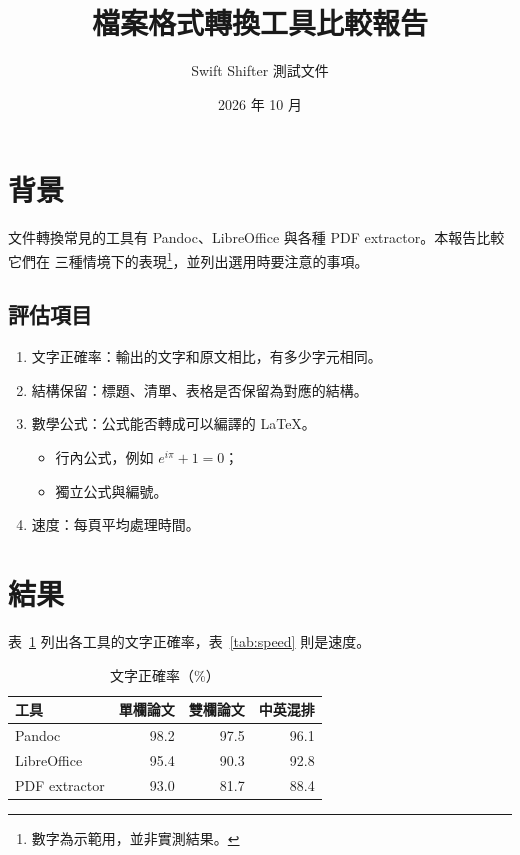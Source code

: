 \documentclass[11pt]{ctexart}
\title{檔案格式轉換工具比較報告}
\author{Swift Shifter 測試文件}
\date{2026 年 10 月}
\begin{document}
\maketitle

\section{背景}

文件轉換常見的工具有 Pandoc、LibreOffice 與各種 PDF extractor。本報告比較它們在
三種情境下的表現\footnote{數字為示範用，並非實測結果。}，並列出選用時要注意的事項。

\subsection{評估項目}

\begin{enumerate}
  \item 文字正確率：輸出的文字和原文相比，有多少字元相同。
  \item 結構保留：標題、清單、表格是否保留為對應的結構。
  \item 數學公式：公式能否轉成可以編譯的 \LaTeX{}。
  \begin{itemize}
    \item 行內公式，例如 $e^{i\pi} + 1 = 0$；
    \item 獨立公式與編號。
  \end{itemize}
  \item 速度：每頁平均處理時間。
\end{enumerate}

\section{結果}

表~\ref{tab:accuracy} 列出各工具的文字正確率，表~\ref{tab:speed} 則是速度。

\begin{table}[h]
  \centering
  \caption{文字正確率（\%）}
  \label{tab:accuracy}
  \begin{tabular}{lrrr}
    \toprule
    工具 & 單欄論文 & 雙欄論文 & 中英混排 \\
    \midrule
    Pandoc        & 98.2 & 97.5 & 96.1 \\
    LibreOffice   & 95.4 & 90.3 & 92.8 \\
    PDF extractor & 93.0 & 81.7 & 88.4 \\
    \bottomrule
  \end{tabular}
\end{table}
\end{document}
